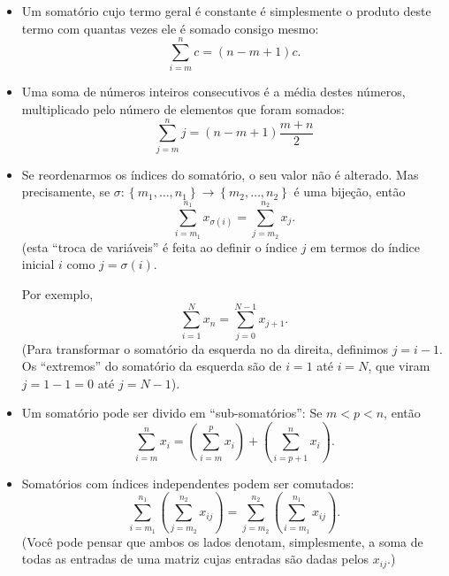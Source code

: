 \begin{itemize}
	\item Um somatório cujo termo geral é constante é simplesmente o produto deste termo com quantas vezes ele é somado consigo mesmo:
	\[\sum_{i=m}^n c=(n-m+1)c.\]
	\item Uma soma de números inteiros consecutivos é a média destes números, multiplicado pelo número de elementos que foram somados:
	\[\sum_{j=m}^n j=(n-m+1)\frac{m+n}{2}\]
	\item Se reordenarmos os índices do somatório, o seu valor não é alterado. Mas precisamente, se $\sigma\colon\left\{m_1,\ldots,n_1\right\}\to\left\{m_2,\ldots,n_2\right\}$ é uma bijeção, então
	\[\sum_{i=m_1}^{n_1}x_{\sigma(i)}=\sum_{j=m_2}^{n_2}x_j.\]
	(esta ``troca de variáveis'' é feita ao definir o índice $j$ em termos do índice inicial $i$ como $j=\sigma(i)$.
	
	Por exemplo,
	\[\sum_{i=1}^N x_n=\sum_{j=0}^{N-1} x_{j+1}.\]
	(Para transformar o somatório da esquerda no da direita, definimos $j=i-1$. Os ``extremos'' do somatório da esquerda são de $i=1$ até $i=N$, que viram $j=1-1=0$ até $j=N-1$).
	\item Um somatório pode ser divido em ``sub-somatórios'': Se $m<p<n$, então
	\[\sum_{i=m}^n x_i=\left(\sum_{i=m}^p x_i\right)+\left(\sum_{i=p+1}^n x_i\right).\]
	\item Somatórios com índices independentes podem ser comutados:
	\[\sum_{i=m_1}^{n_1}\left(\sum_{j=m_2}^{n_2} x_{ij}\right)=\sum_{j=m_2}^{n_2}\left(\sum_{i=m_1}^{n_1} x_{ij}\right).\]
	(Você pode pensar que ambos os lados denotam, simplesmente, a soma de todas as entradas de uma matriz cujas entradas são dadas pelos $x_{ij}$.)
\end{itemize}